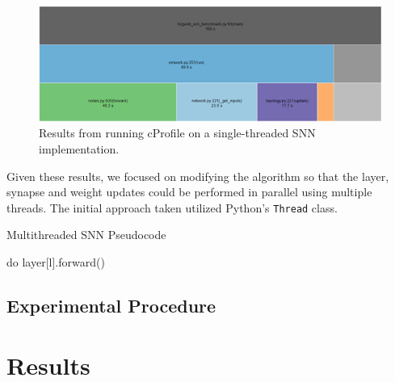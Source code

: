 \documentclass[journal]{IEEEtran}
\begin{document}
\begin{figure}[!t]
\centering
\includegraphics[width=\linewidth]{cprofile.png}
\caption{Results from running cProfile on a single-threaded SNN implementation.}
\label{fig_sim}
\end{figure}

Given these results, we focused on modifying the algorithm so that the layer, synapse and weight updates could be performed in parallel using multiple threads. The initial approach taken utilized Python's \verb|Thread| class. 

\begin{algorithm}
\caption{Multithreaded SNN Pseudocode}
\begin{algorithmic}
%
 do layer[l].forward()
\ENDFOR
{}
\ENDFOR
{}
\ENDFOR
\ENDFOR
\end{algorithmic}
\end{algorithm}

\subsection{Experimental Procedure} 





\section{Results}
\end{document}
